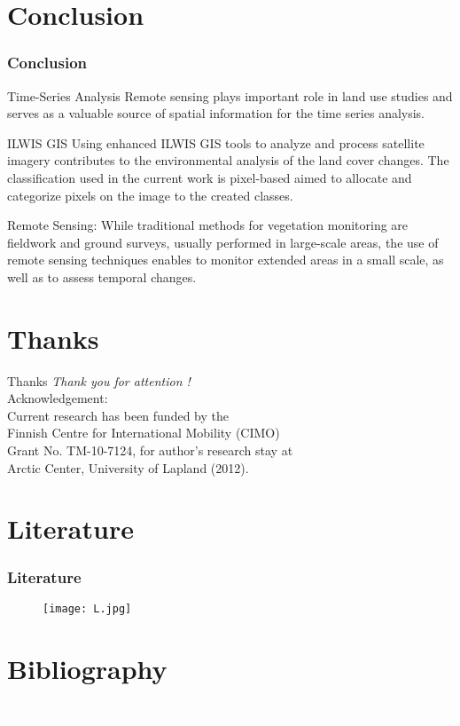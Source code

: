 \documentclass[pdflatex,compress,8pt,
	xcolor={dvipsnames,dvipsnames,svgnames,x11names,table},
	hyperref={colorlinks = true,breaklinks = true, urlcolor = NavyBlue, breaklinks = true}]{beamer}
\begin{document}
\section{Conclusion}
\begin{frame}\frametitle{Conclusion}

\begin{alertblock}{Time-Series Analysis}
Remote sensing plays important role in land use studies and serves as a valuable source of spatial information for the time series analysis.
\end{alertblock}

\begin{block}{ILWIS GIS}
Using enhanced ILWIS GIS tools to analyze and process satellite imagery contributes to the environmental analysis of the land cover changes. The classification used in the current work is pixel-based aimed to allocate and categorize pixels on the image to the created classes.
\end{block}

\begin{examples}{Remote Sensing:}
While traditional methods for vegetation monitoring are fieldwork and ground surveys, usually performed in large-scale areas, the use of remote sensing techniques enables to monitor extended areas in a small scale, as well as to assess temporal changes.
\end{examples}

\end{frame}

\section{Thanks}
\begin{frame}{Thanks}
  	\centering \LARGE 
  	\emph{Thank you for attention !}\\
	\vspace{5em}
\normalsize
Acknowledgement: \\
Current research has been funded by the \\
Finnish Centre for International Mobility (CIMO) \\
Grant No. TM-10-7124, for author's research stay at \\
Arctic Center, University of Lapland (2012).
\end{frame}

\section{Literature}
\begin{frame}\frametitle{Literature}
\begin{figure}[H]
	\centering
		\texttt{[image: L.jpg]}
\end{figure}

\end{frame}

\section{Bibliography}
\large{\textcolor{white}{Bibliography}}
\nocite{*}
\printbibliography
\end{document}
